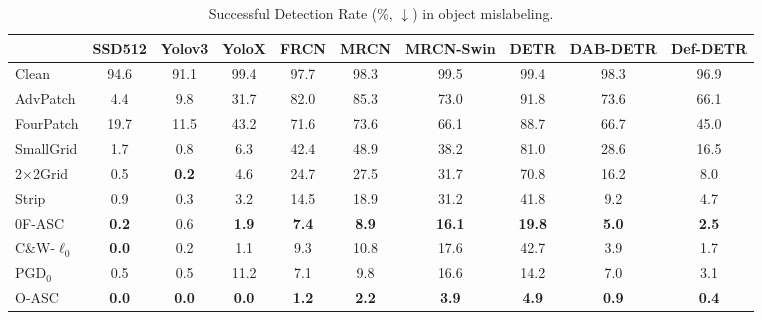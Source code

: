 \documentclass[times,twocolumn,final,authoryear]{elsarticle}
\begin{document}
\begin{table*}[]
\centering
\caption{Successful Detection Rate (\%, $\downarrow$) in object mislabeling. }
\begin{tabular}{l|ccccccccc}
\hline
                & SSD512    & Yolov3    & YoloX     & FRCN      & MRCN      & MRCN-Swin & DETR      &  DAB-DETR     &    Def-DETR       \\ \hline
                \hline
Clean           & 94.6      & 91.1      &   99.4    & 97.7      & 98.3      &   99.5    & 99.4      &    98.3       &  96.9             \\
\hline
AdvPatch        & 4.4       & 9.8       &   31.7    & 82.0      & 85.3      &   73.0    & 91.8      &   73.6        &   66.1            \\
FourPatch       & 19.7      & 11.5      &  43.2     & 71.6      & 73.6      &   66.1    &  88.7     &   66.7        &   45.0            \\
SmallGrid       & 1.7       & 0.8       &   6.3     & 42.4      & 48.9      &  38.2     &  81.0     &  28.6         &    16.5           \\ 
2$\times$2Grid  & 0.5       & \bf{0.2}  &   4.6     & 24.7      & 27.5      &   31.7    &  70.8     &   16.2        &    8.0            \\
Strip           & 0.9       & 0.3       &   3.2     & 14.5      & 18.9      &   31.2    & 41.8      &    9.2        &    4.7            \\ 
0F-ASC           & \bf{0.2}  & 0.6       &  \bf{1.9} & \bf{7.4}  & \bf{8.9}  & \bf{16.1} &  \bf{19.8}&   \bf{5.0}    &    \bf{2.5}            \\\hline \hline 
C\&W-$\ell_0$   & \bf{0.0}  & 0.2       &   1.1     & 9.3       & 10.8      &  17.6     & 42.7      &  3.9          &     1.7         \\ 
PGD$_0$         &   0.5     &  0.5      &   11.2    &  7.1      &  9.8      & 16.6      &  14.2     &   7.0         &  3.1                 \\
O-ASC           & \bf{0.0}  & \bf{0.0}  &  \bf{0.0} & \bf{1.2}  & \bf{2.2}  &  \bf{3.9} & \bf{4.9}  &  \bf{0.9}     &   \bf{0.4}                \\ \hline
\end{tabular}
\label{tab:misclass}

\end{table*}
\end{document}
